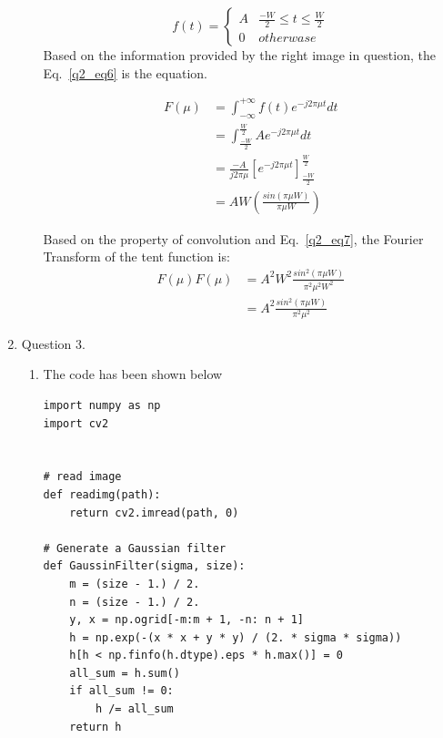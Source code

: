 \documentclass[12pt]{article}
\begin{document}
\begin{enumerate}[leftmargin=\labelsep]
\begin{enumerate}
        \begin{equation}
        f(t) =
        \begin{cases}
        A & \frac{-W}{2} \leq t \leq \frac{W}{2} \\
        0 & otherwase 
        \end{cases}   
        \label{q2_eq6}    
        \end{equation}
        Based on the information provided by the right image in question, the Eq.~\ref{q2_eq6} is the equation.

        \begin{equation}
        \begin{aligned}
        F(\mu)
        &= \int_{-\infty}^{+\infty}f(t) e^{-j2 \pi \mu t}dt\\
        &= \int_{\frac{-W}{2}}^{\frac{W}{2}} A e^{-j2 \pi \mu t} dt\\
        &= \frac{-A}{j2 \pi \mu} [e^{-j 2 \pi \mu t}]_{\frac{-W}{2}}^{\frac{W}{2}}\\
        &= AW (\frac{sin(\pi \mu W)}{\pi \mu W})
        \label{q2_eq7}
        \end{aligned}
        \end{equation}

        Based on the property of convolution and Eq.~\ref{q2_eq7}, the Fourier Transform of the tent function is: 
        \begin{equation}
        \begin{aligned}
        F(\mu)F(\mu)
        &= A^2 W^2 \frac{sin^2(\pi \mu W)}{\pi^2 \mu^2 W^2}\\
        &= A^2 \frac{sin^2(\pi \mu W)}{\pi^2 \mu^2}
        \label{q2_eq8}
        \end{aligned}
        \end{equation}


        \vspace*{1em}
        
\end{enumerate}

\item Question 3.
\begin{enumerate}
\item The code has been shown below

\begin{lstlisting}
import numpy as np
import cv2


# read image
def readimg(path):
    return cv2.imread(path, 0)

# Generate a Gaussian filter
def GaussinFilter(sigma, size):
    m = (size - 1.) / 2.
    n = (size - 1.) / 2.
    y, x = np.ogrid[-m:m + 1, -n: n + 1]
    h = np.exp(-(x * x + y * y) / (2. * sigma * sigma))
    h[h < np.finfo(h.dtype).eps * h.max()] = 0
    all_sum = h.sum()
    if all_sum != 0:
        h /= all_sum
    return h




\end{lstlisting}
\end{enumerate}
\end{enumerate}
\end{document}
